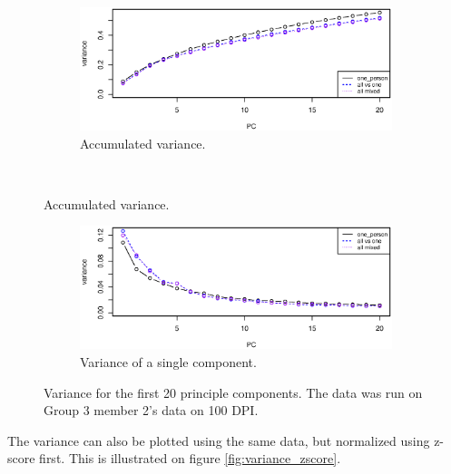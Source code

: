 \begin{figure}[H]
\centering
\begin{subfigure}{0.70\textwidth}
\centering
\includegraphics[width=\textwidth]{graphics/pca_acc_variance}
\caption{Accumulated variance.}
\label{fig:pca_accumulated_var}
\end{subfigure}\\[-1cm]
\end{figure}
\begin{figure}[H]
\centering
\ContinuedFloat
\begin{subfigure}{0.70\textwidth}
\centering
\includegraphics[width=\textwidth]{graphics/pca_variance}
\caption{Variance of a single component.}
\label{fig:pca_var}
\end{subfigure}
\caption[PCA variance.]{Variance for the first 20 principle components.
The data was run on Group 3 member 2's data on 100 DPI. }
\label{fig:variance}
\end{figure}


The variance can also be plotted using the same data, but normalized using z-score first.
This is illustrated on figure \ref{fig:variance_zscore}.




